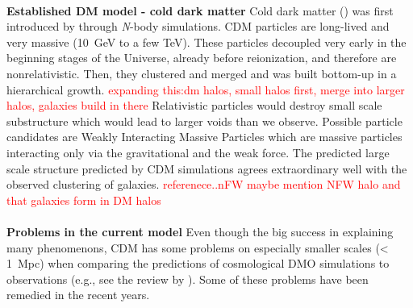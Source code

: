 \\\textbf{Established \ac{DM} model - cold dark matter}
Cold dark matter () was first introduced by \cite{Davis....CDM...1985} through \textit{N}-body simulations. \ac{CDM} particles are long-lived and very massive (\SI{10}{GeV} to a few TeV). These particles decoupled very early in the beginning stages of the Universe, already before reionization, and therefore are nonrelativistic. Then, they clustered and merged and was built bottom-up in a hierarchical growth. \textcolor{red}{expanding this:dm halos, small halos first, merge into larger halos, galaxies build in there} Relativistic particles would destroy small scale substructure which would lead to larger voids than we observe. Possible particle candidates are Weakly Interacting Massive Particles which are massive particles interacting only via the gravitational and the weak force. The predicted large scale structure predicted by \ac{CDM} simulations agrees extraordinary well with the observed clustering of galaxies. \textcolor{red}{referenece..nFW maybe} \textcolor{red}{mention NFW halo and that galaxies form in DM halos}\\
\\\textbf{Problems in the current model}
Even though the big success in explaining many phenomenons, \ac{CDM} has some problems on especially smaller scales (< \SI{1}{Mpc}) when comparing the predictions of cosmological \ac{DMO} simulations to observations (e.g., see the review by \citealp{Bullock...LCDMprobs...2017}). Some of these problems have been remedied in the recent years.
